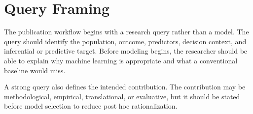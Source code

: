 \section{Query Framing}

The publication workflow begins with a research query rather than a model. The query should identify the population, outcome, predictors, decision context, and inferential or predictive target. Before modeling begins, the researcher should be able to explain why machine learning is appropriate and what a conventional baseline would miss.

A strong query also defines the intended contribution. The contribution may be methodological, empirical, translational, or evaluative, but it should be stated before model selection to reduce post hoc rationalization.
